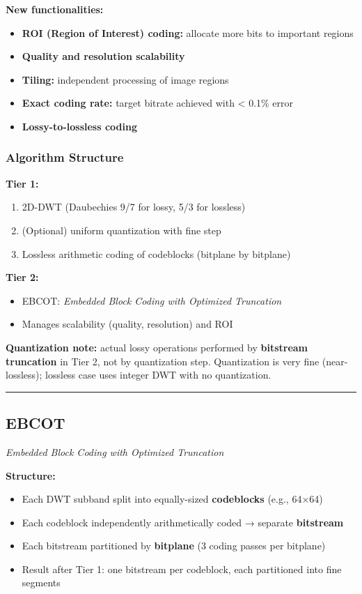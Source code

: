 \textbf{New functionalities:}
\begin{itemize}
\item \textbf{ROI (Region of Interest) coding:} allocate more bits to important regions
\item \textbf{Quality and resolution scalability}
\item \textbf{Tiling:} independent processing of image regions
\item \textbf{Exact coding rate:} target bitrate achieved with \textless{} 0.1\% error
\item \textbf{Lossy-to-lossless coding}
\end{itemize}

\subsubsection{Algorithm Structure}

\textbf{Tier 1:}
\begin{enumerate}
\item 2D-DWT (Daubechies 9/7 for lossy, 5/3 for lossless)
\item (Optional) uniform quantization with fine step
\item Lossless arithmetic coding of codeblocks (bitplane by bitplane)
\end{enumerate}

\textbf{Tier 2:}
\begin{itemize}
\item EBCOT: \textit{Embedded Block Coding with Optimized Truncation}
\item Manages scalability (quality, resolution) and ROI
\end{itemize}

\textbf{Quantization note:} actual lossy operations performed by \textbf{bitstream truncation} in Tier 2, not by quantization step. Quantization is very fine (near-lossless); lossless case uses integer DWT with no quantization.

\bigskip\hrule\bigskip

\subsection{EBCOT}

\textit{Embedded Block Coding with Optimized Truncation}

\textbf{Structure:}
\begin{itemize}
\item Each DWT subband split into equally-sized \textbf{codeblocks} (e.g., 64×64)
\item Each codeblock independently arithmetically coded → separate \textbf{bitstream}
\item Each bitstream partitioned by \textbf{bitplane} (3 coding passes per bitplane)
\item Result after Tier 1: one bitstream per codeblock, each partitioned into fine segments
\end{itemize}

